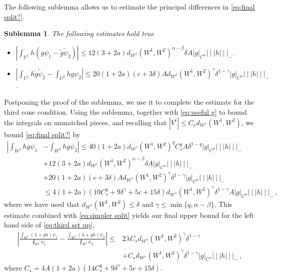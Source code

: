 \documentclass{amsart}
\numberwithin{equation}{section}
\newtheorem{sublem}[thm]{Sublemma}
\newcommand\cW{{\mathcal W}}
\newcommand{\tg}{\tilde{g}}
\newcommand\tpsi{\tilde{\psi}}
\newcommand{\tri}{{|\:\!\!|\:\!\!|}}
\begin{document}
The following sublemma allows us to estimate the principal differences in \eqref{eq:final split?}.
\begin{sublem}
\label{sub:main diff}
The following estimates hold true
\begin{itemize}
  \item[a)] $\displaystyle \left| \int_{U^1} h (g \psi_1 - \tg \tpsi_2) \right|  \le 12 (3 + 2a) d_{\cW^s}(W^1, W^2)^{\alpha - \beta} \delta A |g|_{C^\alpha} \tri h \tri_-$.
  \item[b)] $\displaystyle \left| \int_{U^1} h \tg \tpsi_2 - \int_{U^2} h g \psi_2 \right| 
  \le 20(1+2a) (c+3\delta) A d_{\cW^s}(W^1, W^2)^\gamma \delta^{1-\gamma} |g|_{C^\alpha} \tri h \tri_-$.
\end{itemize}
\end{sublem}

Postponing the proof of the sublemma, we use it to complete the estimate for the third cone condition.
Using the sublemma, together with \eqref{eq:useful g} to bound the integrals on unmatched pieces, 
and recalling that $|V^i| \le C_s d_{\cW^s}(W^1, W^2)$, we 
bound \eqref{eq:final split?} by
\[
\begin{split}
\left| \int_{W^1} hg\psi_1 \right.  & - \left. \int_{W^2} hg\psi_2 \right| 
 \le 40 (1+2a) d_{\cW^s}(W^1, W^2)^q C_s^q A \delta^{1-q} |g|_{C^\alpha} \tri h \tri_- \\
& + 12 (3 + 2a) d_{\cW^s}(W^1, W^2)^{\alpha - \beta} \delta A |g|_{C^\alpha} \tri h \tri_- \\
& + 20(1+2a) (c+3\delta) A d_{\cW^s}(W^1, W^2)^\gamma \delta^{1-\gamma} |g|_{C^\alpha} \tri h \tri_- \\
& \le 4(1+2a)(10 C_s^q + 9\delta^\gamma + 5c + 15 \delta) d_{\cW^s}(W^1, W^2)^\gamma \delta^{1-\gamma} A |g|_{C^\alpha} \tri h \tri_- \, ,
\end{split} 
\] 
where we have used that $d_{\cW^s}(W^1, W^2) \le \delta$ and $\gamma \le \min \{ q, \alpha - \beta \}$.
This estimate combined with \eqref{eq:simpler split} yields our final upper bound for the left hand side of
\eqref{eq:third set up},
\[
\begin{split}
\left| \frac{\int_{W^1} (\lambda + gh) \psi_1}{\fint_{W^1} \psi_1} - \frac{\int_{W^2} (\lambda + gh) \psi_2}{\fint_{W^2} \psi_2} \right|
\le& 2 \lambda C_s d_{\cW^s}(W^1, W^2)^\gamma \delta^{1-\gamma} \\
&+ C_\star d_{\cW^s}(W^1, W^2)^\gamma \delta^{1-\gamma} |g|_{C^\alpha} \tri h \tri_- \, ,
\end{split}\]  
where $C_\star = 4A(1+2a)(14 C_s^q + 9\delta^\gamma + 5c + 15 \delta)$.
\end{document}
